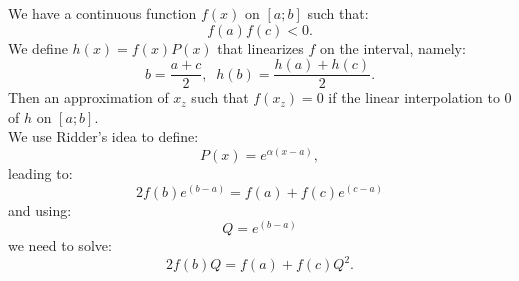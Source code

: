 \documentclass[aps,12pt]{revtex4}
\begin{document}
We have a continuous function $f(x)$ on $[a;b]$ such that:
 $$f(a)f(c)<0.$$
We define $h(x)=f(x)P(x)$ that linearizes $f$ on the interval, namely:
$$b=\frac{a+c}{2},\;\;h(b) = \frac{h(a)+h(c)}{2}.$$
Then an approximation of $x_z$ such that $f(x_z)=0$ if the linear interpolation to $0$
of $h$ on $[a;b]$.\\
We use Ridder's idea to define:
$$P(x)=e^{\alpha(x-a)},$$
leading to:
$$
	2f(b)e^{(b-a)} = f(a) + f(c)e^{(c-a)}
$$
and using:
$$
	Q = e^{(b-a)}
$$
we need to solve:
$$
	2f(b)Q = f(a) + f(c) Q^2.
$$
\end{document}
